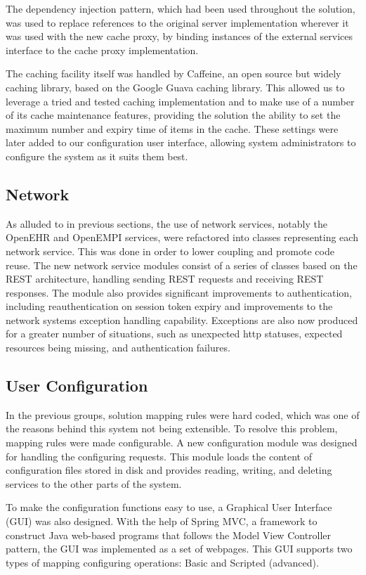 \documentclass[sigconf]{acmart}
\begin{document}
The dependency injection pattern, which had been used throughout the solution, was used to replace references to the original server implementation wherever it was used with the new cache proxy, by binding instances of the external services interface to the cache proxy implementation. 

The caching facility itself was handled by Caffeine, an open source but widely caching library, based on the Google Guava caching library. This allowed us to leverage a tried and tested caching implementation and to make use of a number of its cache maintenance features, providing the solution the ability to set the maximum number and expiry time of items in the cache. These settings were later added to our configuration user interface, allowing system administrators to configure the system as it suits them best.

\subsection{Network}
As alluded to in previous sections, the use of network services, notably the OpenEHR and OpenEMPI services, were refactored into classes representing each network service. This was done in order to lower coupling and promote code reuse. The new network service modules consist of a series of classes based on the REST architecture, handling sending REST requests and receiving REST responses. The module also provides significant improvements to authentication, including reauthentication on session token expiry and improvements to the network systems exception handling capability. Exceptions are also now produced for a greater number of situations, such as unexpected http statuses, expected resources being missing, and authentication failures. 

\subsection{User Configuration}
In the previous groups, solution mapping rules were hard coded, which was one of the reasons behind this system not being extensible. To resolve this problem, mapping rules were made configurable. A new configuration module was designed for handling the configuring requests. This module loads the content of configuration files stored in disk and provides reading, writing, and deleting services to the other parts of the system. 

To make the configuration functions easy to use, a Graphical User Interface (GUI) was also designed. With the help of Spring MVC, a framework to construct Java web-based programs that follows the Model View Controller pattern, the GUI was implemented as a set of webpages. This GUI supports two types of mapping configuring operations: Basic and Scripted (advanced). 
\end{document}
